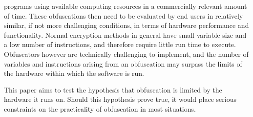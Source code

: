programs using available computing resources in a commercially relevant amount of
time. These obfuscations then need to be evaluated by end users in relatively
similar, if not more challenging conditions, in terms of hardware performance
and functionality. Normal encryption methods in general have small variable size
and a low number of instructions, and therefore require little run time to execute.
Obfuscators however are technically challenging to implement, and the number of
variables and instructions arising from an obfuscation may surpass the limits of
the hardware within which the software is run.
\par
This paper aims to test the hypothesis that obfuscation is limited by the hardware
it runs on. Should this hypothesis prove true, it would place serious constraints
on the practicality of obfuscation in most situations.
